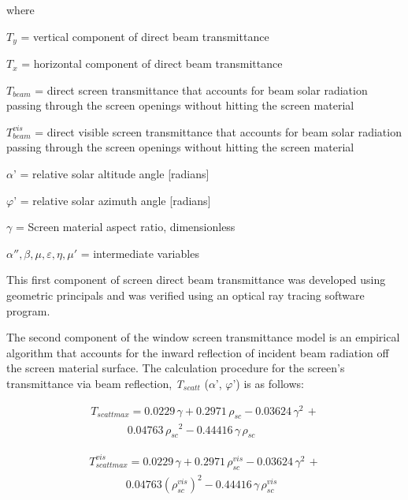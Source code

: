 where

\({T_y}\) = vertical component of direct beam transmittance

\({T_x}\) = horizontal component of direct beam transmittance

\({T_{beam}}\) = direct screen transmittance that accounts for beam solar radiation passing through the screen openings without hitting the screen material

\(T_{beam}^{vis}\) = direct visible screen transmittance that accounts for beam solar radiation passing through the screen openings without hitting the screen material

\(\alpha\)' = relative solar altitude angle {[}radians{]}

\(\varphi\)' = relative solar azimuth angle {[}radians{]}

\(\gamma\) = Screen material aspect ratio, dimensionless

\(\alpha '',\beta ,\mu ,\varepsilon ,\eta ,\mu '\) = intermediate variables

This first component of screen direct beam transmittance was developed using geometric principals and was verified using an optical ray tracing software program.

The second component of the window screen transmittance model is an empirical algorithm that accounts for the inward reflection of incident beam radiation off the screen material surface. The calculation procedure for the screen's transmittance via beam reflection, \emph{T\(_{scatt}\)} (\(\alpha\)', \(\varphi\)') is as follows:

\begin{equation}
\begin{array}{l}{T_{scattmax}} = 0.0229\,\gamma  + 0.2971\,{\rho_{sc}} - 0.03624\,{\gamma ^2}\, + \\\,\,\,\,\,\,\,\,\,\,\,\,\,\,\,\,\,\,\,\,0.04763\,{\rho_{sc}}^2 - 0.44416\,\gamma \,{\rho_{sc}}\end{array}
\end{equation}

\begin{equation}
\begin{array}{l}T_{scattmax}^{vis} = 0.0229\,\gamma  + 0.2971\,\rho_{sc}^{vis} - 0.03624\,{\gamma ^2}\, + \\\,\,\,\,\,\,\,\,\,\,\,\,\,\,\,\,\,\,\,\,0.04763{\left( {\rho_{sc}^{vis}} \right)^2} - 0.44416\,\gamma \,\rho_{sc}^{vis}\end{array}
\end{equation}

